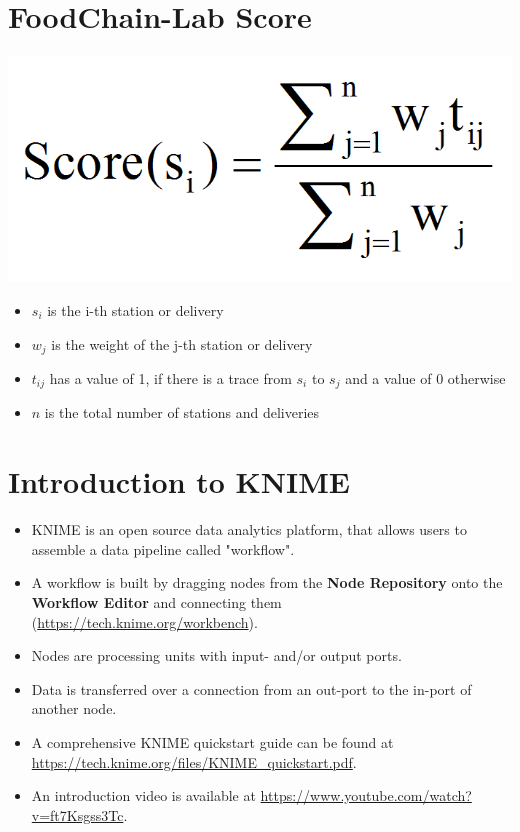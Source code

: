 \documentclass{beamer}
\begin{document}
\section{FoodChain-Lab Score}
\begin{frame}
	\begin{center}
  		\includegraphics[height=0.3\textheight]{score.png}
	\end{center}
	\begin{itemize}
		\item $s_i$ is the i-th station or delivery
		\item $w_j$ is the weight of the j-th station or delivery
		\item $t_{ij}$  has a value of 1, if there is a trace from $s_i$ to $s_j$ and a value of 0 otherwise
		\item $n$ is the total number of stations and deliveries
	\end{itemize}
\end{frame}

\section{Introduction to KNIME}
\begin{frame}
	\begin{itemize}
		\item KNIME is an open source data analytics platform, that allows users to assemble a data pipeline called "workflow".
		\item A workflow is built by dragging nodes from the \textbf{Node Repository} onto the \textbf{Workflow Editor} and connecting them (\url{https://tech.knime.org/workbench}).
		\item Nodes are processing units with input- and/or output ports.
		\item Data is transferred over a connection from an out-port to the in-port of another node.
		\item A comprehensive KNIME quickstart guide can be found at \url{https://tech.knime.org/files/KNIME_quickstart.pdf}.
		\item An introduction video is available at \url{https://www.youtube.com/watch?v=ft7Ksgss3Tc}.
	\end{itemize}
\end{frame}
\end{document}
